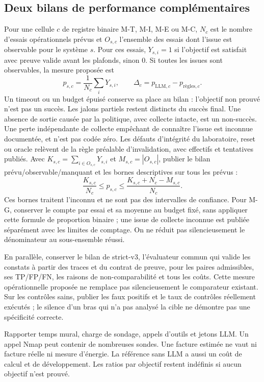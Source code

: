 \documentclass[11pt,a4paper]{article}
\begin{document}
\subsection{Deux bilans de performance complémentaires}
Pour une cellule $c$ de registre binaire M-T, M-I, M-E ou M-C, $N_c$ est le nombre d'essais opérationnels prévus et $O_{s,c}$ l'ensemble des essais dont l'issue est observable pour le système $s$. Pour ces essais, $Y_{s,i}=1$ si l'objectif est satisfait avec preuve valide avant les plafonds, sinon $0$. Si toutes les issues sont observables, la mesure proposée est
\[
 p_{s,c}=\frac{1}{N_c}\sum_i Y_{s,i},\qquad
 \Delta_c=p_{\mathrm{LLM},c}-p_{\text{règles},c}.
\]
Un timeout ou un budget épuisé conserve sa place au bilan : l'objectif non prouvé n'est pas un succès. Les jalons partiels restent distincts du succès final. Une absence de sortie causée par la politique, avec collecte intacte, est un non-succès. Une perte indépendante de collecte empêchant de connaître l'issue est inconnue documentée, et n'est pas codée zéro. Les défauts d'intégrité du laboratoire, reset ou oracle relèvent de la règle préalable d'invalidation, avec effectifs et tentatives publiés. Avec $K_{s,c}=\sum_{i\in O_{s,c}}Y_{s,i}$ et $M_{s,c}=|O_{s,c}|$, publier le bilan prévu/observable/manquant et les bornes descriptives sur tous les prévus :
\[
\frac{K_{s,c}}{N_c}\leq p_{s,c}\leq
\frac{K_{s,c}+N_c-M_{s,c}}{N_c}.
\]
Ces bornes traitent l'inconnu et ne sont pas des intervalles de confiance. Pour M-G, conserver le compte par essai et sa moyenne au budget fixé, sans appliquer cette formule de proportion binaire ; une issue de collecte inconnue est publiée séparément avec les limites de comptage. On ne réduit pas silencieusement le dénominateur au sous-ensemble réussi.

En parallèle, conserver le bilan de strict-v3, l'évaluateur commun qui valide les constats à partir des traces et du contrat de preuve, pour les paires admissibles, ses TP/FP/FN, les raisons de non-comparabilité et tous les coûts. Cette mesure opérationnelle proposée ne remplace pas silencieusement le comparateur existant. Sur les contrôles sains, publier les faux positifs et le taux de contrôles réellement exécutés ; le silence d'un bras qui n'a pas analysé la cible ne démontre pas une spécificité correcte.

Rapporter temps mural, charge de sondage, appels d'outils et jetons LLM. Un appel Nmap peut contenir de nombreuses sondes. Une facture estimée ne vaut ni facture réelle ni mesure d'énergie. La référence sans LLM a aussi un coût de calcul et de développement. Les ratios par objectif restent indéfinis si aucun objectif n'est prouvé.
\end{document}
